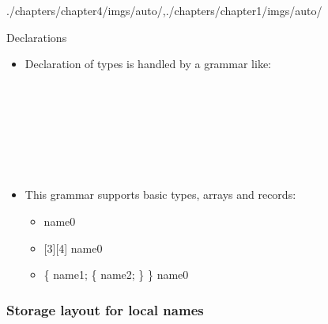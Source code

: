 \begin{graphicspathcontext}{{./chapters/chapter4/imgs/auto/},{./chapters/chapter1/imgs/auto/}}
\begin{bibunit}[apalike]
\begin{frame}[background=8]{Declarations}
	\begin{itemize}
	\item Declaration of types is handled by a grammar like:
		\begin{minipage}[t]{.6\linewidth}
			\vspace{-.75cm}
			\begin{bnf}
				 \\
				\bnfalt*{\bnfes} \\
				 \\
				 \\
				 \\
				 \\
				\bnfalt*{\bnfes}
			\end{bnf}
		\end{minipage}
	\item This grammar supports basic types, arrays and records:
		\begin{itemize}
		\item {} name0
		\item {} name0
		\item {} \{  name1;  \{  name2; \} \} name0
		\end{itemize}
	\end{itemize}
\end{frame}

\subsubsection{Storage layout for local names}
\subsubsectiontableofcontentslide


\end{bibunit}
\end{graphicspathcontext}
